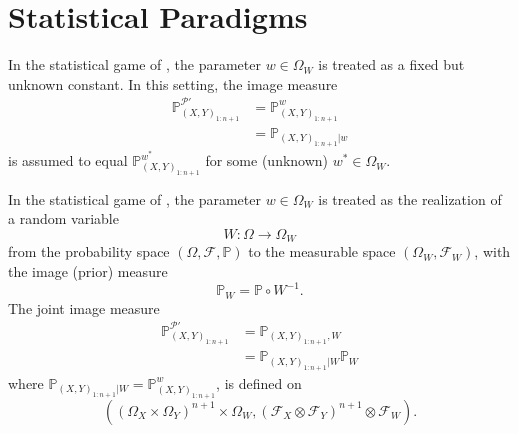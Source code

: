 \chapter{Statistical Paradigms}
\label{chp:statistical_paradigms}
\begin{axiom}
	\label{ax:parameter_fixed}
	In the statistical game of , the parameter $w \in \Omega_W$ is treated as a fixed but unknown constant. In this setting, the image measure 
	\begin{equation}
		\begin{split}
			\mathbb{P}_{(X,Y)_{1\colon n+1}}^{\mathcal{P}'} &= \mathbb{P}_{(X,Y)_{1:n+1}}^w\\
			& =  \mathbb{P}_{(X,Y)_{1:n+1}|w}
		\end{split}
	\end{equation}
	is assumed to equal $\mathbb{P}_{(X,Y)_{1:n+1}}^{w^*}$ for some (unknown) $w^* \in \Omega_W$.
\end{axiom}

\begin{axiom}
	\label{ax:parameter_variable}
	In the statistical game of , the parameter $w \in \Omega_W$ is treated as the realization of a random variable
	\begin{equation}
		W\colon\Omega \to \Omega_W
	\end{equation}
	from the probability space $(\Omega, \mathcal{F}, \mathbb{P})$ to the measurable space $(\Omega_W, \mathcal{F}_W)$, with the image (prior) measure
	\begin{equation}
		\mathbb{P}_{W} = \mathbb{P} \circ W^{-1}.
	\end{equation}
	The joint image measure 
	\begin{equation}
		\begin{split}
			\mathbb{P}_{(X,Y)_{1\colon n+1}}^{\mathcal{P}'} & = \mathbb{P}_{(X,Y)_{1:n+1},W} \\
			&= \mathbb{P}_{(X,Y)_{1:n+1}|W}\mathbb{P}_{W}
		\end{split}
	\end{equation}
	where $\mathbb{P}_{(X,Y)_{1:n+1}|W}=\mathbb{P}_{(X,Y)_{1:n+1}}^w$, is defined on 
	\begin{equation}
		((\Omega_X \times \Omega_Y)^{n+1}\times \Omega_W, (\mathcal{F}_X \otimes \mathcal{F}_Y)^{n+1}\otimes \mathcal{F}_W ).
	\end{equation}
\end{axiom}

